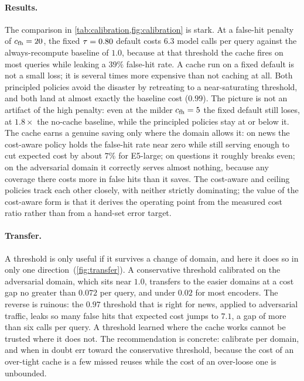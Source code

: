 \paragraph{Results.}
The comparison in \cref{tab:calibration,fig:calibration} is stark. At a false-hit penalty of
$c_{\mathrm{fh}}=20$, the fixed $\tau=0.80$ default costs $6.3$ model calls per query against
the always-recompute baseline of $1.0$, because at that threshold the cache fires on most
queries while leaking a $39\%$ false-hit rate. A cache run on a fixed default is not a small
loss; it is several times more expensive than not caching at all. Both principled policies
avoid the disaster by retreating to a near-saturating threshold, and both land at almost
exactly the baseline cost ($0.99$). The picture is not an artifact of the high penalty: even at
the milder $c_{\mathrm{fh}}=5$ the fixed default still loses, at $1.8\times$ the no-cache
baseline, while the principled policies stay at or below it. The cache earns a genuine saving only where the domain
allows it: on news the cost-aware policy holds the false-hit rate near zero while still
serving enough to cut expected cost by about $7\%$ for E5-large; on questions it roughly
breaks even; on the adversarial domain it correctly serves almost nothing, because any
coverage there costs more in false hits than it saves. The cost-aware and ceiling policies
track each other closely, with neither strictly dominating; the value of the cost-aware form
is that it derives the operating point from the measured cost ratio rather than from a
hand-set error target.

\paragraph{Transfer.}
A threshold is only useful if it survives a change of domain, and here it does so in only one
direction~(\cref{fig:transfer}). A conservative threshold calibrated on the adversarial domain, which sits near
$1.0$, transfers to the easier domains at a cost gap no greater than $0.072$ per query, and
under $0.02$ for most encoders. The reverse is ruinous: the $0.97$ threshold that is right for
news, applied to adversarial traffic, leaks so many false hits that expected cost jumps to
$7.1$, a gap of more than six calls per query.
A threshold learned where the cache works cannot be trusted where it does not. The
recommendation is concrete: calibrate per domain, and when in doubt err toward the
conservative threshold, because the cost of an over-tight cache is a few missed reuses while
the cost of an over-loose one is unbounded.


